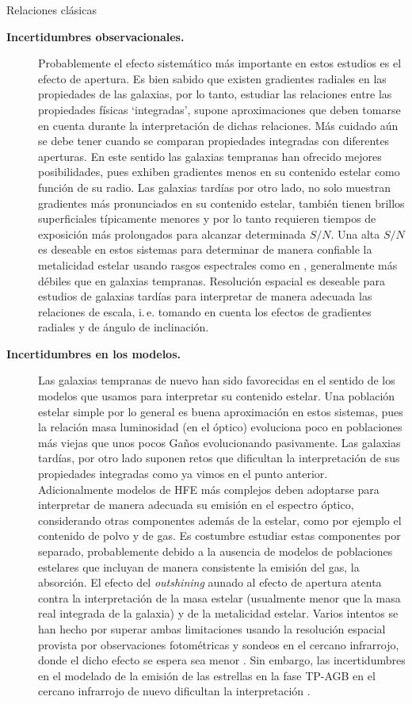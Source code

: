 \documentclass[xcolor=dvipsnames,4pt,hyperref={colorlinks,citecolor=black,linkcolor=black,urlcolor=black}]{beamer}
\begin{document}
\begin{frame}{Relaciones clásicas}
\begin{description}
%
\item[\textbf{Incertidumbres observacionales.}] Probablemente el efecto sistemático más importante
en estos estudios es el efecto de apertura. Es bien sabido que existen gradientes radiales en las
propiedades de las galaxias, por lo tanto, estudiar las relaciones entre las propiedades físicas
`integradas', supone aproximaciones que deben tomarse en cuenta durante la interpretación de dichas
relaciones.
Más cuidado aún se debe tener cuando se comparan propiedades integradas con diferentes aperturas. En
este sentido las galaxias tempranas han ofrecido mejores posibilidades, pues exhiben gradientes
menos en su contenido estelar como función de su radio. Las galaxias tardías por otro lado, no solo
muestran gradientes más pronunciados en su contenido estelar, también tienen brillos superficiales
típicamente menores y por lo tanto requieren tiempos de exposición más prolongados para alcanzar
determinada $S/N$. Una alta $S/N$ es deseable en estos sistemas para determinar de manera confiable
la metalicidad estelar usando rasgos espectrales como en \citet{Gallazzi2005}, generalmente más
débiles que en galaxias tempranas. Resolución espacial es deseable para estudios de galaxias tardías
para interpretar de manera adecuada las relaciones de escala, i.\,e. tomando en cuenta los efectos
de gradientes radiales y de ángulo de inclinación.

\item[\textbf{Incertidumbres en los modelos.}] Las galaxias tempranas de nuevo han sido favorecidas
en el sentido de los modelos que usamos para interpretar su contenido estelar. Una población estelar
simple por lo general es buena aproximación en estos sistemas, pues la relación masa luminosidad (en
el óptico) evoluciona poco en poblaciones más viejas que unos pocos Gaños evolucionando pasivamente.
Las galaxias tardías, por otro lado suponen retos que dificultan la interpretación de sus
propiedades integradas como ya vimos en el punto anterior. Adicionalmente modelos de HFE más
complejos deben adoptarse para interpretar de manera adecuada su emisión en el espectro óptico,
considerando otras componentes además de la estelar, como por ejemplo el contenido de polvo y de
gas. Es costumbre estudiar estas componentes por separado, probablemente debido a la ausencia de
modelos de poblaciones estelares que incluyan de manera consistente la emisión del gas, la
absorción. El efecto del \emph{outshining} aunado al efecto de apertura atenta contra la
interpretación de la masa estelar (usualmente menor que la masa real integrada de la galaxia) y de
la metalicidad estelar. Varios intentos se han hecho por superar ambas limitaciones usando la
resolución espacial provista por observaciones fotométricas \citep{Sorba2015} y sondeos en el
cercano infrarrojo, donde el dicho efecto se espera sea menor \citep{Eminian2008}. Sin embargo, las
incertidumbres en el modelado de la emisión de las estrellas en la fase TP-AGB en el cercano
infrarrojo de nuevo dificultan la interpretación \citep{Zibetti2013}.
%
\end{description}
\end{frame}
\end{document}
